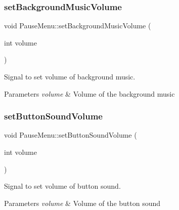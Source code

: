 \mbox{\label{class_pause_menu_ad0c8d82848648993031ece9694b236d2}} 
\subsubsection{\texorpdfstring{setBackgroundMusicVolume}{setBackgroundMusicVolume}}
{\footnotesize\ttfamily void Pause\+Menu\+::set\+Background\+Music\+Volume (\begin{DoxyParamCaption}\item[{int}]{volume }\end{DoxyParamCaption})\hspace{0.3cm}{\ttfamily [signal]}}



Signal to set volume of background music. 


\begin{DoxyParams}{Parameters}
{\em volume} & Volume of the background music \\
\hline
\end{DoxyParams}
\mbox{\label{class_pause_menu_a7b5a4790719c2c8692ce3a30ff1eb6e6}} 
\subsubsection{\texorpdfstring{setButtonSoundVolume}{setButtonSoundVolume}}
{\footnotesize\ttfamily void Pause\+Menu\+::set\+Button\+Sound\+Volume (\begin{DoxyParamCaption}\item[{int}]{volume }\end{DoxyParamCaption})\hspace{0.3cm}{\ttfamily [signal]}}



Signal to set volume of button sound. 


\begin{DoxyParams}{Parameters}
{\em volume} & Volume of the button sound \\
\hline
\end{DoxyParams}
\mbox{\label{class_pause_menu_a4f2c59b2eac366bf3a6a133c0b39ac56}} 
